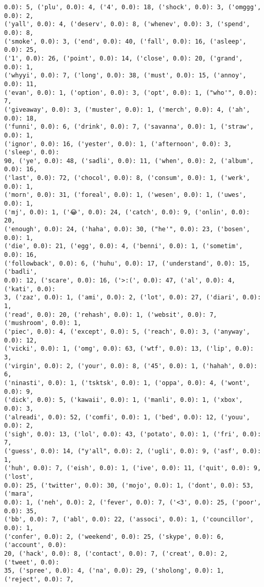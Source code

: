 \documentclass[11pt]{article}
\begin{document}
\begin{Verbatim}[commandchars=\\\{\}]
0.0): 5, ('plu', 0.0): 4, ('4', 0.0): 18, ('shock', 0.0): 3, ('omggg', 0.0): 2,
('yall', 0.0): 4, ('deserv', 0.0): 8, ('whenev', 0.0): 3, ('spend', 0.0): 8,
('smoke', 0.0): 3, ('end', 0.0): 40, ('fall', 0.0): 16, ('asleep', 0.0): 25,
('1', 0.0): 26, ('point', 0.0): 14, ('close', 0.0): 20, ('grand', 0.0): 1,
('whyyi', 0.0): 7, ('long', 0.0): 38, ('must', 0.0): 15, ('annoy', 0.0): 11,
('evan', 0.0): 1, ('option', 0.0): 3, ('opt', 0.0): 1, ("who'", 0.0): 7,
('giveaway', 0.0): 3, ('muster', 0.0): 1, ('merch', 0.0): 4, ('ah', 0.0): 18,
('funni', 0.0): 6, ('drink', 0.0): 7, ('savanna', 0.0): 1, ('straw', 0.0): 1,
('ignor', 0.0): 16, ('yester', 0.0): 1, ('afternoon', 0.0): 3, ('sleep', 0.0):
90, ('ye', 0.0): 48, ('sadli', 0.0): 11, ('when', 0.0): 2, ('album', 0.0): 16,
('last', 0.0): 72, ('chocol', 0.0): 8, ('consum', 0.0): 1, ('werk', 0.0): 1,
('morn', 0.0): 31, ('foreal', 0.0): 1, ('wesen', 0.0): 1, ('uwes', 0.0): 1,
('mj', 0.0): 1, ('😂', 0.0): 24, ('catch', 0.0): 9, ('onlin', 0.0): 20,
('enough', 0.0): 24, ('haha', 0.0): 30, ("he'", 0.0): 23, ('bosen', 0.0): 1,
('die', 0.0): 21, ('egg', 0.0): 4, ('benni', 0.0): 1, ('sometim', 0.0): 16,
('followback', 0.0): 6, ('huhu', 0.0): 17, ('understand', 0.0): 15, ('badli',
0.0): 12, ('scare', 0.0): 16, ('>:(', 0.0): 47, ('al', 0.0): 4, ('kati', 0.0):
3, ('zaz', 0.0): 1, ('ami', 0.0): 2, ('lot', 0.0): 27, ('diari', 0.0): 1,
('read', 0.0): 20, ('rehash', 0.0): 1, ('websit', 0.0): 7, ('mushroom', 0.0): 1,
('piec', 0.0): 4, ('except', 0.0): 5, ('reach', 0.0): 3, ('anyway', 0.0): 12,
('vicki', 0.0): 1, ('omg', 0.0): 63, ('wtf', 0.0): 13, ('lip', 0.0): 3,
('virgin', 0.0): 2, ('your', 0.0): 8, ('45', 0.0): 1, ('hahah', 0.0): 6,
('ninasti', 0.0): 1, ('tsktsk', 0.0): 1, ('oppa', 0.0): 4, ('wont', 0.0): 9,
('dick', 0.0): 5, ('kawaii', 0.0): 1, ('manli', 0.0): 1, ('xbox', 0.0): 3,
('alreadi', 0.0): 52, ('comfi', 0.0): 1, ('bed', 0.0): 12, ('youu', 0.0): 2,
('sigh', 0.0): 13, ('lol', 0.0): 43, ('potato', 0.0): 1, ('fri', 0.0): 7,
('guess', 0.0): 14, ("y'all", 0.0): 2, ('ugli', 0.0): 9, ('asf', 0.0): 1,
('huh', 0.0): 7, ('eish', 0.0): 1, ('ive', 0.0): 11, ('quit', 0.0): 9, ('lost',
0.0): 25, ('twitter', 0.0): 30, ('mojo', 0.0): 1, ('dont', 0.0): 53, ('mara',
0.0): 1, ('neh', 0.0): 2, ('fever', 0.0): 7, ('<3', 0.0): 25, ('poor', 0.0): 35,
('bb', 0.0): 7, ('abl', 0.0): 22, ('associ', 0.0): 1, ('councillor', 0.0): 1,
('confer', 0.0): 2, ('weekend', 0.0): 25, ('skype', 0.0): 6, ('account', 0.0):
20, ('hack', 0.0): 8, ('contact', 0.0): 7, ('creat', 0.0): 2, ('tweet', 0.0):
35, ('spree', 0.0): 4, ('na', 0.0): 29, ('sholong', 0.0): 1, ('reject', 0.0): 7,

\end{Verbatim}
\end{document}
